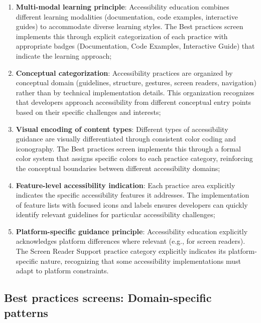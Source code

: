 \begin{enumerate}
    \item \textbf{Multi-modal learning principle}: Accessibility education combines different learning modalities (documentation, code examples, interactive guides) to accommodate diverse learning styles. The Best practices screen implements this through explicit categorization of each practice with appropriate badges (Documentation, Code Examples, Interactive Guide) that indicate the learning approach;
    
    \item \textbf{Conceptual categorization}: Accessibility practices are organized by conceptual domain (guidelines, structure, gestures, screen readers, navigation) rather than by technical implementation details. This organization recognizes that developers approach accessibility from different conceptual entry points based on their specific challenges and interests;
    
    \item \textbf{Visual encoding of content types}: Different types of accessibility guidance are visually differentiated through consistent color coding and iconography. The Best practices screen implements this through a formal color system that assigns specific colors to each practice category, reinforcing the conceptual boundaries between different accessibility domains;
    
    \item \textbf{Feature-level accessibility indication}: Each practice area explicitly indicates the specific accessibility features it addresses. The implementation of feature lists with focused icons and labels ensures developers can quickly identify relevant guidelines for particular accessibility challenges;
    
    \item \textbf{Platform-specific guidance principle}: Accessibility education explicitly acknowledges platform differences where relevant (e.g., for screen readers). The Screen Reader Support practice category explicitly indicates its platform-specific nature, recognizing that some accessibility implementations must adapt to platform constraints.
\end{enumerate}

\subsection{Best practices screens: Domain-specific patterns}
\label{subsec:best-practices-screens-beyond-wcag}

